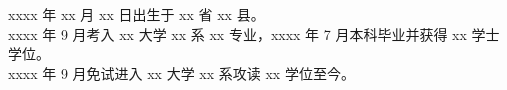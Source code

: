 \noindent xxxx 年 xx 月 xx 日出生于 xx 省 xx 县。\\
\noindent xxxx 年 9 月考入 xx 大学 xx 系 xx 专业，xxxx 年 7 月本科毕业并获得 xx 学士学位。\\
\noindent xxxx 年 9 月免试进入 xx 大学 xx 系攻读 xx 学位至今。


\begin{refsection}
\setcounter{gbnamefmtcase}{1}%
\nocite{ref-1-1-Yang,ref-2-1-杨轶,ref-3-1-杨轶,ref-4-1-Yang,ref-5-1-Wu,ref-6-1-贾泽,ref-7-1-伍晓明}

\printbibliography[heading=subbibliography,title={发表论文：}] %

\end{refsection}


\begin{refsection}
\setcounter{gbnamefmtcase}{1}%
\nocite{ref-8-1-任天令,ref-9-1-Ren}

\printbibliography[heading=subbibliography,title={研究成果：}]

\end{refsection}
